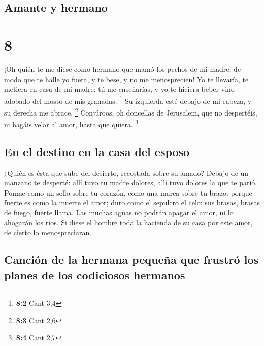 \hypertarget{amante-y-hermano}{%
\subsection{Amante y hermano}\label{amante-y-hermano}}

\hypertarget{section-7}{%
\section{8}\label{section-7}}

 ¡Oh quién te me diese como hermano que mamó los pechos de
mi madre; de modo que te halle yo fuera, y te bese, y no me
menosprecien!  Yo te llevaría, te metiera en casa de mi
madre: tú me enseñarías, y yo te hiciera beber vino adobado del mosto de
mis granadas. \footnote{\textbf{8:2} Cant 3,4}  Su
izquierda esté debajo de mi cabeza, y su derecha me abrace. \footnote{\textbf{8:3}
  Cant 2,6}  Conjúroos, oh doncellas de Jerusalem, que no
despertéis, ni hagáis velar al amor, hasta que quiera. \footnote{\textbf{8:4}
  Cant 2,7}

\hypertarget{en-el-destino-en-la-casa-del-esposo}{%
\subsection{En el destino en la casa del
esposo}\label{en-el-destino-en-la-casa-del-esposo}}

 ¿Quién es ésta que sube del desierto, recostada sobre su
amado? Debajo de un manzano te desperté: allí tuvo tu madre dolores,
allí tuvo dolores la que te parió.  Ponme como un sello
sobre tu corazón, como una marca sobre tu brazo: porque fuerte es como
la muerte el amor; duro como el sepulcro el celo: sus brasas, brasas de
fuego, fuerte llama.  Las muchas aguas no podrán apagar el
amor, ni lo ahogarán los ríos. Si diese el hombre toda la hacienda de su
casa por este amor, de cierto lo menospreciaran.

\hypertarget{canciuxf3n-de-la-hermana-pequeuxf1a-que-frustruxf3-los-planes-de-los-codiciosos-hermanos}{%
\subsection{Canción de la hermana pequeña que frustró los planes de los
codiciosos
hermanos}\label{canciuxf3n-de-la-hermana-pequeuxf1a-que-frustruxf3-los-planes-de-los-codiciosos-hermanos}}

